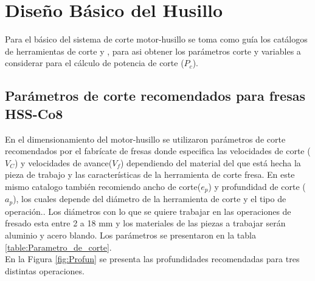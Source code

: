\section{Diseño Básico del Husillo}
Para el básico del sistema de corte motor-husillo se toma como guía los catálogos de herramientas de corte  \cite{catalogue:CatalogoC006s} y \cite{catalogue:Blue_Master} , para asi obtener los parámetros corte y variables a considerar para el cálculo de potencia de corte ($P_c$). 

\subsection{Parámetros de corte recomendados para fresas HSS-Co8}

En el dimensionamiento del motor-husillo se utilizaron parámetros de corte recomendados por el fabrícate de fresas \cite{catalogue:Blue_Master} donde especifica las velocidades de corte ($V_C$) y velocidades de avance($V_f$) dependiendo del material del que está hecha la pieza de trabajo y las características de la herramienta de corte fresa. En este mismo catalogo también recomiendo ancho de corte($e_p$) y profundidad de corte ($a_p$), los cuales depende del diámetro de la herramienta de corte y el tipo de operación.. Los diámetros con lo que se quiere trabajar en las operaciones de fresado esta entre 2 a 18 mm y los materiales de las piezas a trabajar serán aluminio y acero blando. Los parámetros se presentaron en la tabla \ref{table:Parametro_de_corte}.\\

En la Figura \ref{fig:Profun} se presenta las profundidades recomendadas para tres distintas operaciones.  

